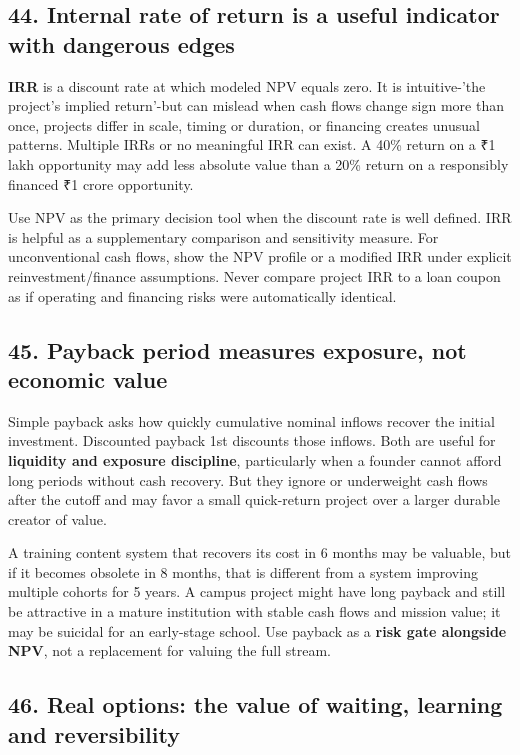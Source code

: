 \subsection{44. Internal rate of return is a useful indicator with dangerous edges}


\textbf{IRR} is a discount rate at which modeled NPV equals zero. It is intuitive-'the project's implied return'-but can mislead when cash flows change sign more than once, projects differ in scale, timing or duration, or financing creates unusual patterns. Multiple IRRs or no meaningful IRR can exist. A 40\% return on a ₹1 lakh opportunity may add less absolute value than a 20\% return on a responsibly financed ₹1 crore opportunity.

Use NPV as the primary decision tool when the discount rate is well defined. IRR is helpful as a supplementary comparison and sensitivity measure. For unconventional cash flows, show the NPV profile or a modified IRR under explicit reinvestment/finance assumptions. Never compare project IRR to a loan coupon as if operating and financing risks were automatically identical.

\subsection{45. Payback period measures exposure, not economic value}


Simple payback asks how quickly cumulative nominal inflows recover the initial investment. Discounted payback 1st discounts those inflows. Both are useful for \textbf{liquidity and exposure discipline}, particularly when a founder cannot afford long periods without cash recovery. But they ignore or underweight cash flows after the cutoff and may favor a small quick-return project over a larger durable creator of value.

A training content system that recovers its cost in 6 months may be valuable, but if it becomes obsolete in 8 months, that is different from a system improving multiple cohorts for 5 years. A campus project might have long payback and still be attractive in a mature institution with stable cash flows and mission value; it may be suicidal for an early-stage school. Use payback as a \textbf{risk gate alongside NPV}, not a replacement for valuing the full stream.

\subsection{46. Real options: the value of waiting, learning and reversibility}


